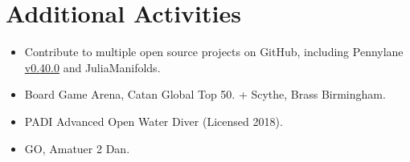 \documentclass[a4paper,10pt]{article}
\begin{document}
\section*{Additional Activities}
\begin{itemize}[nosep,leftmargin=1.5em]
  \setlength\itemsep{0.1em}
  \item Contribute to multiple open source projects on GitHub, including Pennylane \href{https://github.com/PennyLaneAI/pennylane/releases/tag/v0.40.0}{v0.40.0} and JuliaManifolds.
  \item Board Game Arena, Catan Global Top 50. + Scythe, Brass Birmingham.
  \item PADI Advanced Open Water Diver (Licensed 2018).
  \item GO, Amatuer 2 Dan.
\end{itemize}

\end{document}
